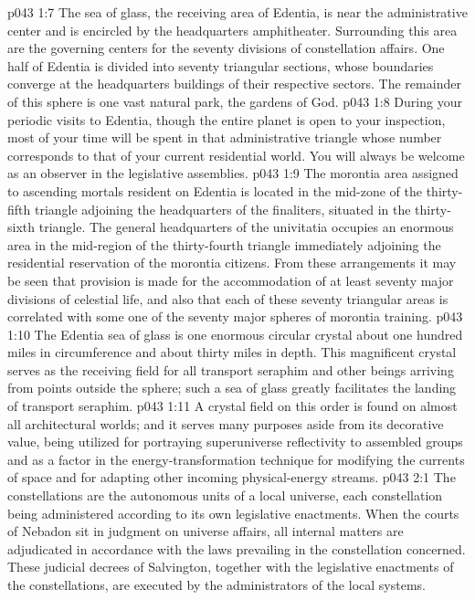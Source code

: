 \pc \vs p043 1:7 The sea of glass, the receiving area of Edentia, is near the administrative center and is encircled by the headquarters amphitheater. Surrounding this area are the governing centers for the seventy divisions of constellation affairs. One half of Edentia is divided into seventy triangular sections, whose boundaries converge at the headquarters buildings of their respective sectors. The remainder of this sphere is one vast natural park, the gardens of God.
\vs p043 1:8 During your periodic visits to Edentia, though the entire planet is open to your inspection, most of your time will be spent in that administrative triangle whose number corresponds to that of your current residential world. You will always be welcome as an observer in the legislative assemblies.
\vs p043 1:9 The morontia area assigned to ascending mortals resident on Edentia is located in the mid\hyp{}zone of the thirty\hyp{}fifth triangle adjoining the headquarters of the finaliters, situated in the thirty\hyp{}sixth triangle. The general headquarters of the univitatia occupies an enormous area in the mid\hyp{}region of the thirty\hyp{}fourth triangle immediately adjoining the residential reservation of the morontia citizens. From these arrangements it may be seen that provision is made for the accommodation of at least seventy major divisions of celestial life, and also that each of these seventy triangular areas is correlated with some one of the seventy major spheres of morontia training.
\vs p043 1:10 The Edentia sea of glass is one enormous circular crystal about one hundred miles in circumference and about thirty miles in depth. This magnificent crystal serves as the receiving field for all transport seraphim and other beings arriving from points outside the sphere; such a sea of glass greatly facilitates the landing of transport seraphim.
\vs p043 1:11 A crystal field on this order is found on almost all architectural worlds; and it serves many purposes aside from its decorative value, being utilized for portraying superuniverse reflectivity to assembled groups and as a factor in the energy\hyp{}transformation technique for modifying the currents of space and for adapting other incoming physical\hyp{}energy streams.
%
\vs p043 2:1 The constellations are the autonomous units of a local universe, each constellation being administered according to its own legislative enactments. When the courts of Nebadon sit in judgment on universe affairs, all internal matters are adjudicated in accordance with the laws prevailing in the constellation concerned. These judicial decrees of Salvington, together with the legislative enactments of the constellations, are executed by the administrators of the local systems.
